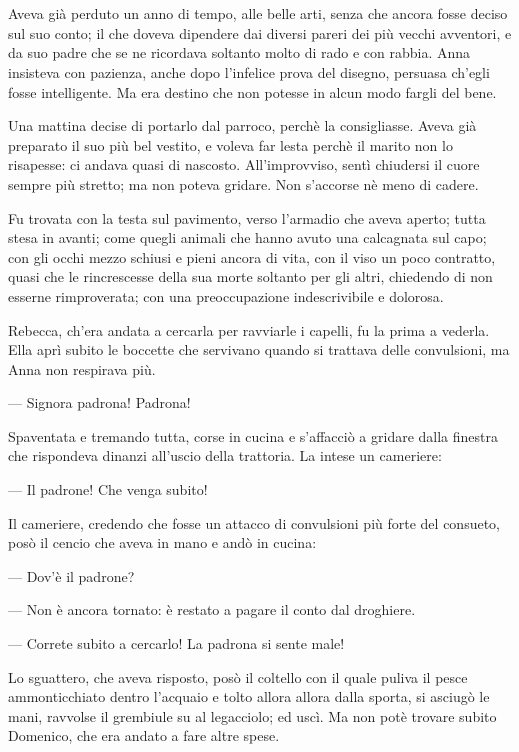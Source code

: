 \chapter{}

Aveva già perduto un anno di tempo, alle belle arti, senza che ancora fosse deciso sul suo conto; il che doveva dipendere dai diversi pareri dei più vecchi avventori, e da suo padre che se ne ricordava soltanto molto di rado e con rabbia. Anna insisteva con pazienza, anche dopo l'infelice prova del disegno, persuasa ch'egli fosse intelligente. Ma era destino che non potesse in alcun modo fargli del bene.

Una mattina decise di portarlo dal parroco, perchè la consigliasse. Aveva già preparato il suo più bel vestito, e voleva far lesta perchè il marito non lo risapesse: ci andava quasi di nascosto. All'improvviso, sentì chiudersi il cuore sempre più stretto; ma non poteva gridare. Non s'accorse nè meno di cadere.

Fu trovata con la testa sul pavimento, verso l'armadio che aveva aperto; tutta stesa in avanti; come quegli animali che hanno avuto una calcagnata sul capo; con gli occhi mezzo schiusi e pieni ancora di vita, con il viso un poco contratto, quasi che le rincrescesse della sua morte soltanto per gli altri, chiedendo di non esserne rimproverata; con una preoccupazione indescrivibile e dolorosa.

Rebecca, ch'era andata a cercarla per ravviarle i capelli, fu la prima a vederla. Ella aprì subito le boccette che servivano quando si trattava delle convulsioni, ma Anna non respirava più.

— Signora padrona! Padrona!

Spaventata e tremando tutta, corse in cucina e s'affacciò a gridare dalla finestra che rispondeva dinanzi all'uscio della trattoria. La intese un cameriere:

— Il padrone! Che venga subito!

Il cameriere, credendo che fosse un attacco di convulsioni più forte del consueto, posò il cencio che aveva in mano e andò in cucina:

— Dov'è il padrone?

— Non è ancora tornato: è restato a pagare il conto dal droghiere.

— Correte subito a cercarlo! La padrona si sente male!

Lo sguattero, che aveva risposto, posò il coltello con il quale puliva il pesce ammonticchiato dentro l'acquaio e tolto allora allora dalla sporta, si asciugò le mani, ravvolse il grembiule su al legacciolo; ed uscì. Ma non potè trovare subito Domenico, che era andato a fare altre spese.

